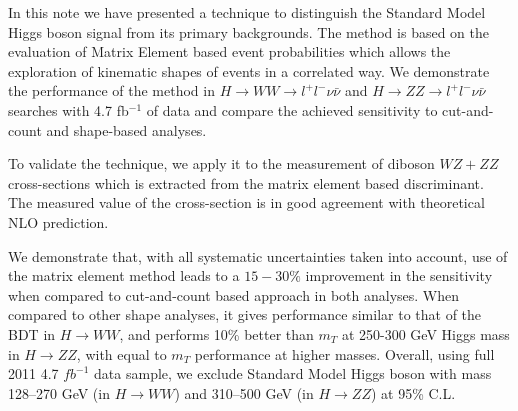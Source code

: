 In this note we have presented a technique to distinguish the Standard Model Higgs boson signal
from its primary backgrounds. The method is based on the evaluation of Matrix Element based event probabilities 
which allows the exploration of kinematic shapes of events in a correlated way. We demonstrate the
performance of the method in $H \rightarrow WW \rightarrow l^{+}l^{-}\nu\bar{\nu}$ and $H \rightarrow ZZ \rightarrow l^{+}l^{-}\nu\bar{\nu}$ searches with 4.7 fb$^{-1}$ of data and compare the achieved sensitivity to cut-and-count and shape-based analyses.  

To validate the technique, we apply it to the measurement of diboson $WZ+ZZ$ cross-sections which is extracted from
the matrix element based discriminant. The measured value of the cross-section is in good agreement with theoretical NLO prediction.

We demonstrate that, with all systematic uncertainties taken into account, use of the matrix element method 
leads to a $15-30 \%$ improvement in the sensitivity when compared to cut-and-count based approach in both analyses. 
When compared to other shape analyses, it gives performance similar to that of the BDT in $H\rightarrow WW$, and performs 10\% better 
than $m_{T}$ at 250-300 GeV Higgs mass in $H\rightarrow ZZ$, with equal to $m_{T}$ performance at higher masses. 
Overall, using full 2011 4.7 $fb^{-1}$ data sample, we exclude Standard Model Higgs boson with 
mass 128--270 GeV (in $H\rightarrow WW$) and 310--500 GeV (in $H\rightarrow ZZ$) at 95\% C.L.

